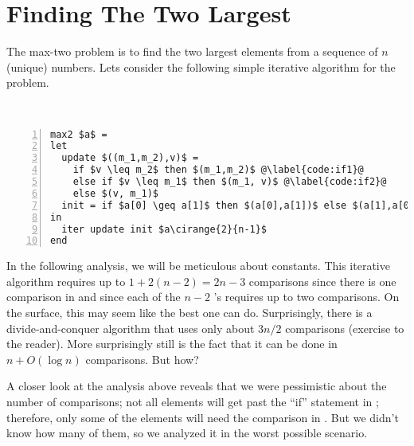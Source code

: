 {%

\section{Finding The Two Largest}

The max-two problem is to find the two largest elements from a
sequence of $n$ (unique) numbers.  Lets consider the following simple
iterative algorithm for the problem.
\begin{algorithm}~
\begin{lstlisting}[numbers=left]
max2 $a$ = 
let
  update $((m_1,m_2),v)$ =
    if $v \leq m_2$ then $(m_1,m_2)$ @\label{code:if1}@
    else if $v \leq m_1$ then $(m_1, v)$ @\label{code:if2}@
    else $(v, m_1)$
  init = if $a[0] \geq a[1]$ then $(a[0],a[1])$ else $(a[1],a[0])$ @\label{code:start}@
in 
  iter update init $a\cirange{2}{n-1}$
end
\end{lstlisting}
\end{algorithm}

In the following analysis, we will be meticulous about constants.
This iterative algorithm requires up to $ 1 + 2(n-2) = 2n -3$
comparisons since there is one comparison in  and since each
of the $n-2$ 's requires up to two comparisons.
%
On the surface, this may seem like the best
one can do.  Surprisingly, there is a divide-and-conquer algorithm
that uses only about $3n/2$ comparisons (exercise to the reader).
More surprisingly still is the fact that it can be done in $n + O(\log
n)$ comparisons. But how?


A closer look at the analysis above reveals that we were pessimistic
about the number of comparisons; not all elements will get past the
``if'' statement in ; therefore, only some of the
elements will need the comparison in . But we
didn't know how many of them, so we analyzed it in the worst possible
scenario.

}
